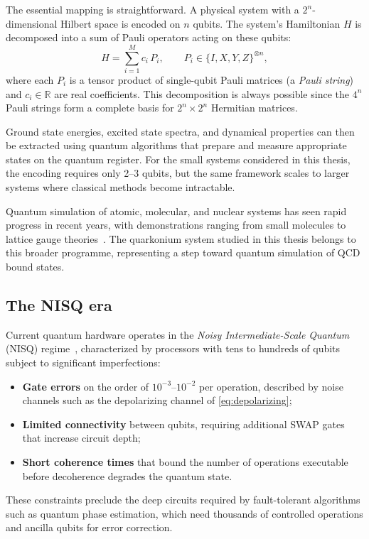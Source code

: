 The essential mapping is straightforward. A physical system with a
$2^n$-dimensional Hilbert space is encoded on $n$ qubits. The system's
Hamiltonian $H$ is decomposed into a sum of Pauli operators acting on these
qubits:
\begin{equation}
  \label{eq:pauli_ham}
  H = \sum_{i=1}^{M} c_i\, P_i,
  \qquad P_i \in \{I,X,Y,Z\}^{\otimes n},
\end{equation}
where each $P_i$ is a tensor product of single-qubit Pauli matrices (a
\emph{Pauli string}) and $c_i\in\mathbb{R}$ are real coefficients. This
decomposition is always possible since the $4^n$ Pauli strings form a complete
basis for $2^n\times 2^n$ Hermitian matrices.

Ground state energies, excited state spectra, and dynamical properties can then
be extracted using quantum algorithms that prepare and measure appropriate states
on the quantum register. For the small systems considered in this thesis, the
encoding requires only 2--3 qubits, but the same framework scales to larger
systems where classical methods become intractable.

Quantum simulation of atomic, molecular, and nuclear systems has seen rapid
progress in recent years, with demonstrations ranging from small molecules to
lattice gauge theories~\cite{peruzzo2014}. The quarkonium system studied in this
thesis belongs to this broader programme, representing a step toward quantum
simulation of QCD bound states.


\subsection{The NISQ era}
\label{sec:nisq}

Current quantum hardware operates in the \emph{Noisy Intermediate-Scale Quantum}
(NISQ) regime~\cite{preskill2018}, characterized by processors with tens to
hundreds of qubits subject to significant imperfections:
\begin{itemize}
  \item \textbf{Gate errors} on the order of $10^{-3}$--$10^{-2}$ per operation,
    described by noise channels such as the depolarizing channel of
    \cref{eq:depolarizing};
  \item \textbf{Limited connectivity} between qubits, requiring additional SWAP
    gates that increase circuit depth;
  \item \textbf{Short coherence times} that bound the number of operations
    executable before decoherence degrades the quantum state.
\end{itemize}
These constraints preclude the deep circuits required by fault-tolerant algorithms
such as quantum phase estimation, which need thousands of controlled operations
and ancilla qubits for error correction.

